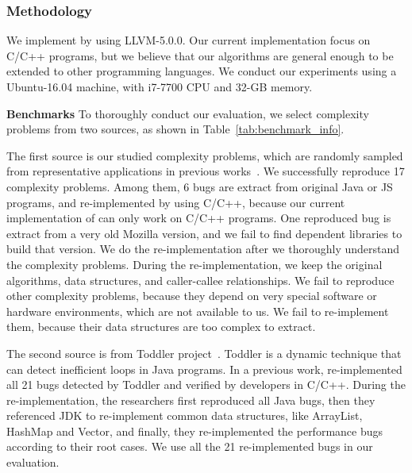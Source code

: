 \subsubsection{Methodology}
We implement \Tool by using LLVM-5.0.0.
Our current implementation focus on C/C++ programs, 
but we believe that our algorithms are general enough to be extended 
to other programming languages.
We conduct our experiments using a Ubuntu-16.04 machine, 
with i7-7700 CPU and 32-GB memory. 

%

\textbf{Benchmarks}
To thoroughly conduct our evaluation, 
we select complexity problems from two sources, as shown in Table~\ref{tab:benchmark_info}. 

The first source is our studied complexity problems, 
which are randomly sampled from representative applications in previous works~\cite{PerfBug,SongOOPSLA2014}.
We successfully reproduce 17 complexity problems. 
Among them, 6 bugs are extract from original Java or JS programs, 
and re-implemented by using C/C++, 
because our current implementation of \Tool can only work on C/C++ programs.
One reproduced bug is extract from a very old Mozilla version, 
and we fail to find dependent libraries to build that version. 
We do the re-implementation after we thoroughly understand the complexity problems.
During the re-implementation, we keep the original algorithms, 
data structures, and caller-callee relationships. 
We fail to reproduce other complexity problems, 
because they depend on very special software or hardware environments, 
which are not available to us. 
We fail to re-implement them, 
because their data structures are too complex to extract.

The second source is from Toddler project~\cite{Alabama}. 
Toddler is a dynamic technique that can detect inefficient loops in Java programs.
In a previous work, \citet{ldoctor} re-implemented all 
21 bugs detected by Toddler and verified by developers in C/C++.
During the re-implementation, the researchers first reproduced all Java bugs, 
then they referenced JDK to re-implement 
common data structures, like ArrayList, HashMap and Vector, 
and finally, they re-implemented the performance bugs according to their root cases. 
We use all the 21 re-implemented bugs in our evaluation.  

